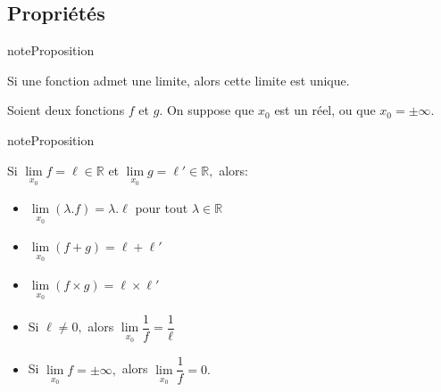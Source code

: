 \documentclass[letterpaper,10pt,french]{jupyterBook}
\begin{document}
\subsection{Propriétés}
\label{\detokenize{limitefcts:proprietes}}
\begin{sphinxadmonition}{note}{Proposition}

\sphinxAtStartPar
Si une fonction admet une limite, alors cette limite est unique.
\end{sphinxadmonition}

\sphinxAtStartPar
Soient deux fonctions \(f\) et \(g.\) On suppose que \(x_0\) est un réel, ou que \(x_0=\pm\infty.\)

\begin{sphinxadmonition}{note}{Proposition}

\sphinxAtStartPar
Si \(\lim\limits_{\substack{x_{0}}}f=\ell\in \mathbb{R}\) et \(\lim\limits_{\substack{x_{0}}}g=\ell'\in \mathbb{R},\) alors:
\begin{itemize}
\item {} 
\sphinxAtStartPar
\(\lim\limits_{\substack{x_{0}}}(\lambda. f)=\lambda.\ell\) pour tout \(\lambda\in \mathbb{R}\)

\item {} 
\sphinxAtStartPar
\(\lim\limits_{\substack{x_{0}}}(f+g)=\ell+\ell'\)

\item {} 
\sphinxAtStartPar
\(\lim\limits_{\substack{x_{0}}}(f\times g)=\ell\times \ell'\)

\item {} 
\sphinxAtStartPar
Si \(\ell\neq0,\) alors \(\lim\limits_{\substack{x_{0}}}\dfrac{1}{f}=\dfrac{1}{\ell}\)

\item {} 
\sphinxAtStartPar
Si \(\lim\limits_{\substack{x_{0}}}f=\pm\infty,\) alors \(\lim\limits_{\substack{x_{0}}}\dfrac{1}{f}=0.\)

\end{itemize}
\end{sphinxadmonition}
\end{document}

